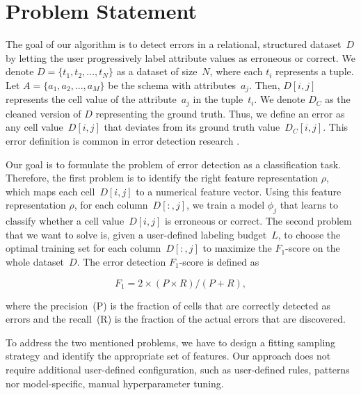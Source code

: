 \section{Problem Statement}
\label{sec:problem}

The goal of our algorithm is to detect errors in a relational, structured dataset~$D$ by letting the user progressively label attribute values as erroneous or correct.
We denote $D = \{t_{1}, t_{2}, ..., t_{N}\}$ as a dataset of size~$N$, where each $t_{i}$ represents a tuple. 
Let $A = \{a_{1}, a_{2}, ..., a_{M}\}$ be the schema with attributes~$a_{j}$. Then, $D[i, j]$ represents the cell value of the attribute~$a_{j}$ in the tuple~$t_{i}$.
We denote $D_{C}$ as the cleaned version of $D$ representing the ground truth. 
Thus, we define an error as any cell value~$D[i, j]$ that deviates from its ground truth value~$D_{C}[i, j]$. 
This error definition is common in error detection research \cite{rekatsinas2017holoclean,abedjan2016detecting}.

Our goal is to formulate the problem of error detection as a classification task. 
Therefore, the first problem is to identify the right feature representation $\rho$, which maps each cell~$D[i, j]$ to a numerical feature vector.
Using this feature representation $\rho$, for each column~$D[:,j]$, we train a model $\phi_{j}$ that learns to classify whether a cell value~$D[i, j]$ is erroneous or correct.
The second problem that we want to solve is, given a user-defined labeling budget~$L$, to choose the optimal training set for each column~$D[:,j]$ to maximize the $F_{1}$-score on the whole dataset~$D$. The error detection $F_{1}$-score is defined as 

\begin{equation} \label{equation:problem2}
	F_1 = 2 \times (P \times R) /(P + R),
\end{equation}

where the precision~(P) is the fraction of cells that are correctly detected as errors and the recall~(R) is the fraction of the actual errors that are discovered.

To address the two mentioned problems, we have to design a fitting sampling strategy and identify the appropriate set of features. Our approach does not require additional user-defined configuration, such as user-defined rules, patterns nor model-specific, manual hyperparameter tuning.
